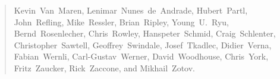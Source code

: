\begin{quote}
Kevin~Van~Maren,        %
Lenimar~Nunes~de~Andrade, %
Hubert~Partl,           %
John~Refling,           %
Mike~Ressler,           %
Brian~Ripley,           %
Young~U.~Ryu,           %
Bernd~Rosenlecher,      %
Chris~Rowley,           %
Hanspeter~Schmid,       %
Craig~Schlenter,        %
Christopher~Sawtell,    %
Geoffrey~Swindale,      %
Josef~Tkadlec,          %
Didier~Verna,           %
Fabian~Wernli,          %
Carl-Gustav~Werner,     %
David~Woodhouse,        %
Chris~York,             %
Fritz~Zaucker,          %
Rick~Zaccone,           %
and Mikhail~Zotov.      %
\end{quote}




\pagebreak
\endinput
